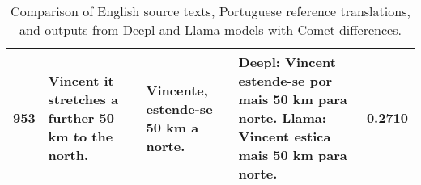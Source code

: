 \begin{table}[htbp]
\begin{tabular}{|c|p{4cm}|p{4cm}|p{4cm}|c|}
        \hline
        953 & Vincent it stretches a further 50 km to the north. & Vincente, estende-se 50 km a norte. & Deepl: Vincent estende-se por mais 50 km para norte. \newline Llama: Vincent estica mais 50 km para norte. & 0.2710 \\
        \hline
    \end{tabular}
    \caption{Comparison of English source texts, Portuguese reference translations, and outputs from Deepl and Llama models with Comet differences.}
    \label{tab:translation_examples}
\end{table}
